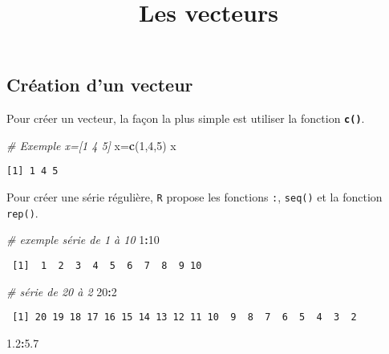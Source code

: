 \documentclass[
]{article}
\title{Les vecteurs}
\author{}
\date{\vspace{-2.5em}}
\newenvironment{Shaded}{\begin{snugshade}}{\end{snugshade}}
\newcommand{\CommentTok}[1]{\textcolor[rgb]{0.56,0.35,0.01}{\textit{#1}}}
\newcommand{\DecValTok}[1]{\textcolor[rgb]{0.00,0.00,0.81}{#1}}
\newcommand{\FloatTok}[1]{\textcolor[rgb]{0.00,0.00,0.81}{#1}}
\newcommand{\KeywordTok}[1]{\textcolor[rgb]{0.13,0.29,0.53}{\textbf{#1}}}
\newcommand{\NormalTok}[1]{#1}
\newcommand{\OperatorTok}[1]{\textcolor[rgb]{0.81,0.36,0.00}{\textbf{#1}}}
\begin{document}
\maketitle

\hypertarget{cruxe9ation-dun-vecteur}{%
\subsection{Création d'un vecteur}\label{cruxe9ation-dun-vecteur}}

Pour créer un vecteur, la façon la plus simple est utiliser la fonction
\textbf{\texttt{c()}}.

\begin{Shaded}
\begin{Highlighting}[]
\CommentTok{# Exemple x=[1 4 5]}
\NormalTok{x=}\KeywordTok{c}\NormalTok{(}\DecValTok{1}\NormalTok{,}\DecValTok{4}\NormalTok{,}\DecValTok{5}\NormalTok{)}
\NormalTok{x}
\end{Highlighting}
\end{Shaded}

\begin{verbatim}
[1] 1 4 5
\end{verbatim}

Pour créer une série régulière, \texttt{R} propose les fonctions
\texttt{:}, \texttt{seq()} et la fonction \texttt{rep()}.

\begin{Shaded}
\begin{Highlighting}[]
\CommentTok{# exemple série de 1 à 10}
\DecValTok{1}\OperatorTok{:}\DecValTok{10}
\end{Highlighting}
\end{Shaded}

\begin{verbatim}
 [1]  1  2  3  4  5  6  7  8  9 10
\end{verbatim}

\begin{Shaded}
\begin{Highlighting}[]
\CommentTok{# série de 20 à 2}
\DecValTok{20}\OperatorTok{:}\DecValTok{2}
\end{Highlighting}
\end{Shaded}

\begin{verbatim}
 [1] 20 19 18 17 16 15 14 13 12 11 10  9  8  7  6  5  4  3  2
\end{verbatim}

\begin{Shaded}
\begin{Highlighting}[]
\FloatTok{1.2}\OperatorTok{:}\FloatTok{5.7}  
\end{Highlighting}
\end{Shaded}
\end{document}
